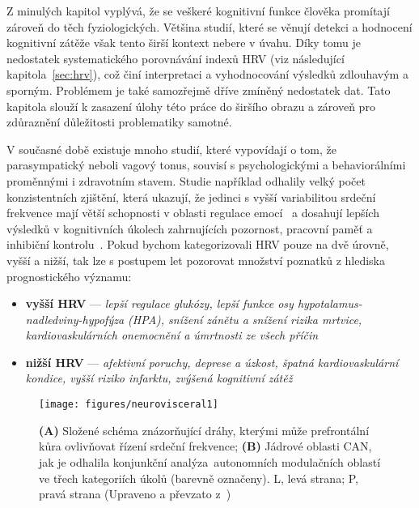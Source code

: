 Z minulých kapitol vyplývá, že se veškeré kognitivní funkce člověka promítají
zároveň do těch fyziologických. Většina studií, které se věnují detekci a
hodnocení kognitivní zátěže však tento širší kontext nebere v úvahu. Díky tomu
je nedostatek systematického porovnávání indexů HRV (viz následující
kapitola~\ref{sec:hrv}), což činí interpretaci a vyhodnocování výsledků
zdlouhavým a sporným. Problémem je také samozřejmě dříve zmíněný nedostatek dat.
Tato kapitola slouží k zasazení úlohy této práce do širšího obrazu a zároveň pro
zdůraznění důležitosti problematiky samotné. 

V současné době existuje mnoho studií, které vypovídají o tom, že parasympatický
neboli vagový tonus, souvisí s psychologickými a behaviorálními proměnnými i
zdravotním stavem. Studie například odhalily velký počet konzistentních
zjištění, která ukazují, že jedinci s vyšší variabilitou srdeční frekvence mají
větší schopnosti v oblasti regulace emocí~\cite{Appelhans_Luecken_2006,
Butler_Wilhelm_Gross_2006,Ingjaldsson_Laberg_Thayer_2003,Lane_2008,
Melzig_Weike_Hamm_Thayer_2009, Thayer_Brosschot_2005} a dosahují lepších
výsledků v kognitivních úkolech zahrnujících pozornost, pracovní paměť a
inhibiční kontrolu~\cite{Thayer2009,Hansen_Johnsen_Thayer_2003,
Johnsen_Thayer_Laberg_Wormnes_Raadal_Skaret_Kvale_Berg_2003,
Saus_Johnsen_Eid_Riisem_Andersen_Thayer_2006}. Pokud bychom kategorizovali HRV
pouze na dvě úrovně, vyšší a nižší, tak lze s postupem let pozorovat množství
poznatků z hlediska prognostického významu:
\begin{itemize}
    \item \textbf{vyšší HRV} --- \emph{lepší regulace glukózy, lepší funkce osy
              hypotalamus-nadledviny-hypofýza (HPA), snížení zánětu a snížení rizika
              mrtvice, kardiovaskulárních onemocnění a úmrtnosti ze všech
              příčin}~\cite{Brosschot_Thayer_2007,Liao_Carnethon_Evans_Cascio_Heiss_2002,Thayer_Fischer_2009,Thayer_Lane_2007}
    \item \textbf{nižší HRV} --- \emph{afektivní poruchy, deprese a úzkost,
              špatná kardiovaskulární kondice, vyšší riziko infarktu, zvýšená kognitivní
              zátěž}~\cite{Gorman_Sloan_2000,Kemp_Quintana_2013,Kemp_Quintana_Felmingham_Matthews_Jelinek_2012}
\end{itemize}

\begin{figure}[!htb]
    \begin{center}
        \texttt{[image: figures/neurovisceral1]}
        \caption{\textbf{(A)} Složené schéma znázorňující dráhy, kterými může
        prefrontální kůra ovlivňovat řízení srdeční frekvence; \textbf{(B)}
        Jádrové oblasti \gls{CAN}, jak je odhalila konjunkční
        analýza\protect\footnotemark\ autonomních modulačních oblastí ve třech
        kategoriích úkolů (barevně označeny). L, levá strana; P, pravá strana
        (Upraveno a převzato z~\cite{gianaros2008,Beissner2013})}
        \label{fig:neurovisceral_diagram}
    \end{center}
\end{figure}

